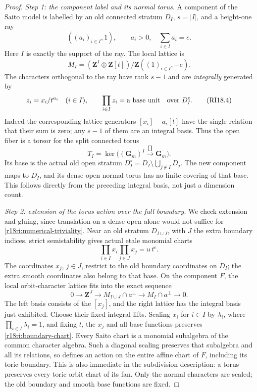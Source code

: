 \begin{proof}
\emph{Step 1: the component label and its normal torus.}
A component of the Saito model is labelled by an old connected
stratum $D_I$, $s=|I|$, and a height-one ray
\[
                 ((a_i)_{i\in I},1),\qquad
                   a_i>0,\quad \sum_{i\in I}a_i=e.
 \tag{RI18.3}\label{r18ri:ray}
\]
Here $I$ is exactly the support of the ray.  The local lattice is
\[
 M_I=(\mathbf Z^I\oplus\mathbf Z[t])/
                              \mathbf Z((1)_{i\in I},-e).
\]
The characters orthogonal to the ray have rank $s-1$ and are
\emph{integrally} generated by
\[
                         z_i=x_i/t^{a_i}\quad (i\in I),
                   \qquad \prod_{i\in I}z_i=\text{a base unit}
                     \quad\hbox{over }D_I^\circ.
 \tag{RI18.4}\label{r18ri:normal-characters}
\]
Indeed the corresponding lattice generators
$[x_i]-a_i[t]$ have the single relation that their sum is zero;
any $s-1$ of them are an integral basis.
Thus the open fiber is a torsor for the split connected torus
\[
                T_I=\ker\bigl((\mathbf G_m)^I
                                         \xrightarrow{\prod}\mathbf G_m\bigr).
 \tag{RI18.5}\label{r18ri:torus-group}
\]
Its base is the actual old open stratum
$D_I^\circ=D_I\setminus\bigcup_{j\notin I}D_j$.
The new component maps to $D_I$, and its dense open normal torus
has no finite covering of that base.  This follows directly from
the preceding integral basis, not just a dimension count.

\emph{Step 2: extension of the torus action over the full boundary.}
We check extension and gluing, since translation on a dense open
alone would not suffice for \eqref{r18ri:numerical-triviality}.
Near an old stratum $D_{I\cup J}$, with $J$ the extra boundary
indices, strict semistability gives actual etale monomial charts
\[
                  \prod_{i\in I}x_i\prod_{j\in J}x_j
                                     =u\,t^e.
 \tag{RI18.6}\label{r18ri:boundary-chart}
\]
The coordinates $x_j$, $j\in J$, restrict to the old boundary
coordinates on $D_I$; the extra smooth coordinates also belong to
that base.  On the component $F$, the local orbit-character
lattice fits into the exact sequence
\[
 0\longrightarrow\mathbf Z^J
 \longrightarrow M_{I\cup J}\cap a^\perp
 \longrightarrow M_I\cap a^\perp\longrightarrow0.
 \tag{RI18.7}\label{r18ri:boundary-lattice}
\]
The left basis consists of the $[x_j]$, and the right lattice has
the integral basis just exhibited.  Choose their fixed integral
lifts.  Scaling $x_i$ for $i\in I$ by $\lambda_i$, where
$\prod_{i\in I}\lambda_i=1$, and fixing $t$, the $x_j$ and all
base functions preserves \eqref{r18ri:boundary-chart}.
Every Saito chart is a monomial subalgebra of the common character
algebra.  Such a diagonal scaling preserves that subalgebra and
all its relations, so defines an action on the entire affine chart
of $F$, including its toric boundary.  This is also immediate in
the subdivision description: a torus preserves every toric orbit
chart of its fan.  Only the normal characters are scaled; the old
boundary and smooth base functions are fixed.


\end{proof}
